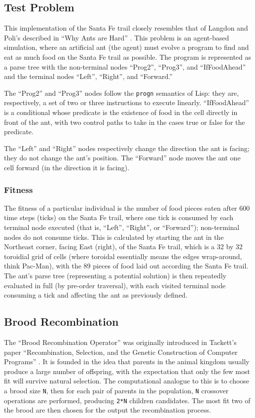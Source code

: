\documentclass{acm_proc_article-sp}
\begin{document}
\subsection{Test Problem}
This implementation of the Santa Fe trail closely resembles that of
Langdon and Poli's described in ``Why Ants are Hard''
\cite{Langdon:Hard}. This problem is an agent-based simulation, where
an artificial ant (the agent) must evolve a program to find and eat as
much food on the Santa Fe trail as possible. The program is
represented as a parse tree with the non-terminal nodes ``Prog2'',
``Prog3'', and ``IfFoodAhead'' and the terminal nodes ``Left'',
``Right'', and ``Forward.''

The ``Prog2'' and ``Prog3'' nodes follow the \texttt{progn} semantics
of Lisp: they are, respectively, a set of two or three instructions to
execute linearly. ``IfFoodAhead'' is a conditional whose predicate is
the existence of food in the cell directly in front of the ant, with
two control paths to take in the cases true or false for the
predicate.

The ``Left'' and ``Right'' nodes respectively change the direction the
ant is facing; they do not change the ant's position. The ``Forward''
node moves the ant one cell forward (in the direction it is facing).

\subsubsection{Fitness}
The fitness of a particular individual is the number of food pieces
eaten after 600 time steps (ticks) on the Santa Fe trail, where one
tick is consumed by each terminal node executed (that is, ``Left'',
``Right'', or ``Forward''); non-terminal nodes do not consume
ticks. This is calculated by starting the ant in the Northeast corner,
facing East (right), of the Santa Fe trail, which is a 32 by 32
toroidial grid of cells (where toroidal essentially means the edges
wrap-around, think Pac-Man), with the 89 pieces of food laid out
according the Santa Fe trail. The ant's parse tree (representing a
potential solution) is then repeatedly evaluated in full (by pre-order
traversal), with each visited terminal node consuming a tick and
affecting the ant as previously defined.

\subsection{Brood Recombination}
The ``Brood Recombination Operator'' was originally introduced in
Tackett's paper ``Recombination, Selection, and the Genetic
Construction of Computer Programs'' \cite{Tackett:Brood}. It is
founded in the idea that parents in the animal kingdom usually produce
a large number of offspring, with the expectation that only the few
most fit will survive natural selection. The computational analogue to
this is to choose a brood size \texttt{N}, then for each pair of
parents in the population, \texttt{N} crossover operations are
performed, producing \texttt{2*N} children candidates. The most fit
two of the brood are then chosen for the output the recombination
process.
\end{document}

